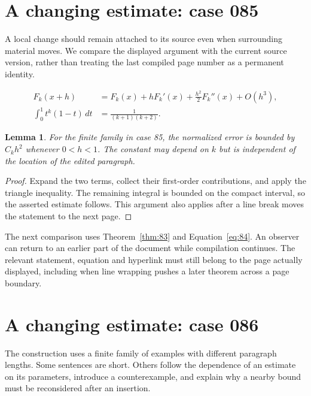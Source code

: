 \documentclass[a4paper,10pt]{article}
\newtheorem{lemma}[theorem]{Lemma}
\begin{document}
\lipsum[18]

\section{A changing estimate: case 085}\label{unit:84}
A local change should remain attached to its source even when surrounding material moves. We compare the displayed argument with the current source version, rather than treating the last compiled page number as a permanent identity.

\lipsum[13-14]
\begin{align}\label{eq:84}
 F_k(x+h)&=F_k(x)+hF_k'(x)+\frac{h^2}{2}F_k''(x)+O(h^3),\\
 \int_0^1 t^k(1-t)\,dt&=\frac{1}{(k+1)(k+2)}.
\end{align}
\begin{lemma}\label{thm:84}
For the finite family in case 85, the normalized error is bounded by $C_k h^2$ whenever $0<h<1$. The constant may depend on $k$ but is independent of the location of the edited paragraph.
\end{lemma}
\begin{proof}
Expand the two terms, collect their first-order contributions, and apply the
triangle inequality. The remaining integral is bounded on the compact interval,
so the asserted estimate follows. This argument also applies after a line break
moves the statement to the next page.
\end{proof}
The next comparison uses Theorem~\ref{thm:83} and Equation~\ref{eq:84}. An observer can return to an earlier part of the document while compilation continues. The relevant statement, equation and hyperlink must still belong to the page actually displayed, including when line wrapping pushes a later theorem across a page boundary.

\lipsum[23]

\section{A changing estimate: case 086}\label{unit:85}
The construction uses a finite family of examples with different paragraph lengths. Some sentences are short. Others follow the dependence of an estimate on its parameters, introduce a counterexample, and explain why a nearby bound must be reconsidered after an insertion.
\end{document}
